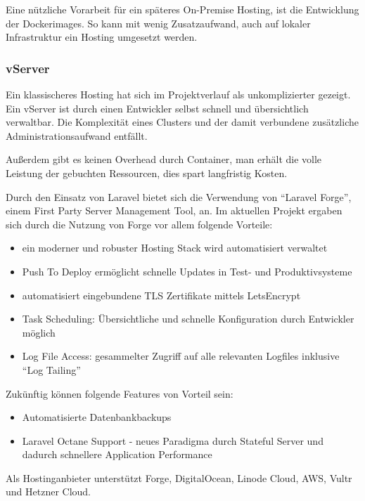 Eine nützliche Vorarbeit für ein späteres On-Premise Hosting, ist die Entwicklung der Dockerimages.
So kann mit wenig Zusatzaufwand, auch auf lokaler Infrastruktur ein Hosting umgesetzt werden.
\newpage

\subsubsection{vServer}
Ein klassischeres Hosting hat sich im Projektverlauf als unkomplizierter gezeigt.
Ein vServer ist durch einen Entwickler selbst schnell und übersichtlich verwaltbar.
Die Komplexität eines Clusters und der damit verbundene zusätzliche Administrationsaufwand entfällt.

Außerdem gibt es keinen Overhead durch Container, man erhält die volle Leistung der gebuchten Ressourcen, dies spart langfristig Kosten.

Durch den Einsatz von Laravel bietet sich die Verwendung von \enquote{Laravel Forge}\cite{laravel-forge}, einem First Party Server Management Tool, an.
Im aktuellen Projekt ergaben sich durch die Nutzung von Forge vor allem folgende Vorteile:
\begin{itemize}
    \item ein moderner und robuster Hosting Stack wird automatisiert verwaltet
    \item Push To Deploy ermöglicht schnelle Updates in Test- und Produktivsysteme
    \item automatisiert eingebundene TLS Zertifikate mittels LetsEncrypt
    \item Task Scheduling: Übersichtliche und schnelle Konfiguration durch Entwickler möglich
    \item Log File Access: gesammelter Zugriff auf alle relevanten Logfiles inklusive \enquote{Log Tailing}
\end{itemize}

Zukünftig können folgende Features von Vorteil sein:
\begin{itemize}
    \item Automatisierte Datenbankbackups
    \item Laravel Octane Support - neues Paradigma durch Stateful Server und dadurch schnellere Application Performance\cite{laravel-octane}
\end{itemize}

Als Hostinganbieter unterstützt Forge, DigitalOcean, Linode Cloud, AWS, Vultr und Hetzner Cloud.

